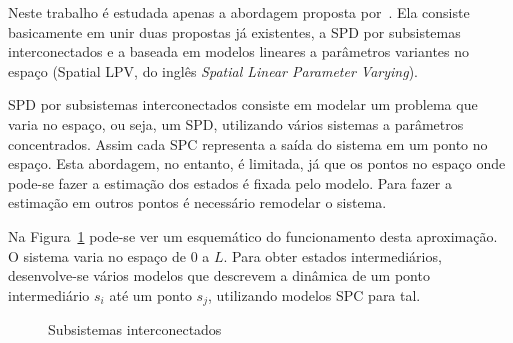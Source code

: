 Neste trabalho é estudada apenas a abordagem proposta
por~\textcite{masterthesis:nelson}. Ela consiste basicamente em unir duas
propostas já existentes, a SPD por subsistemas interconectados e a baseada em
modelos lineares a parâmetros variantes no espaço (Spatial \ac{LPV}, do inglês
\textit{Spatial Linear Parameter Varying}).

SPD por subsistemas interconectados consiste em modelar um problema que varia no
espaço, ou seja, um \ac{SPD}, utilizando vários sistemas a parâmetros
concentrados. Assim cada \ac{SPC} representa a saída do sistema em um ponto no
espaço. Esta abordagem, no entanto, é limitada, já que os pontos no espaço onde
pode-se fazer a estimação dos estados é fixada pelo modelo. Para fazer a
estimação em outros pontos é necessário remodelar o sistema.

Na Figura~\ref{fig:interconected-subsystems} pode-se ver um esquemático do
funcionamento desta aproximação. O sistema varia no espaço de \( 0 \) a \( L \).
Para obter estados intermediários, desenvolve-se vários modelos que descrevem a
dinâmica de um ponto intermediário \( s_i \) até um ponto \( s_j \), utilizando
modelos \ac{SPC} para tal.

\begin{figure}[ht!]
	\centering
	\captionsetup{justification=centering}
	\caption{Subsistemas interconectados}%
	\label{fig:interconected-subsystems}
\end{figure}

